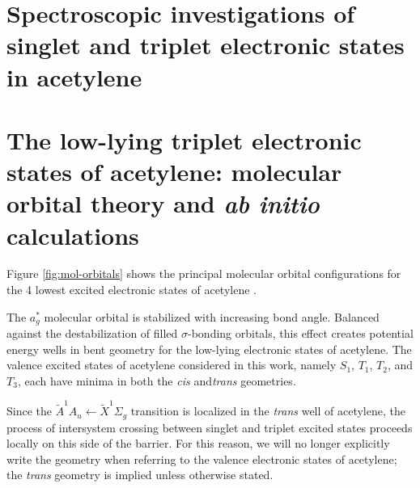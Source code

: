 \documentclass[12pt]{mitthesis}
\begin{document}
\section{Spectroscopic investigations of singlet and
  triplet electronic states in acetylene}




\section{The low-lying triplet electronic states of acetylene:
  molecular orbital theory and \emph{ab initio} calculations}

Figure \ref{fig:mol-orbitals} shows the principal molecular orbital
configurations for the 4 lowest excited electronic states of
acetylene \cite{yamaguchi93}.

  The
$a_g^*$ molecular orbital is stabilized with increasing  bond
angle.  Balanced against the destabilization of filled
$\sigma$-bonding orbitals, this effect creates potential energy wells
in bent geometry for the low-lying electronic states of acetylene.
The valence excited states of acetylene considered in this work,
namely $S_1$, $T_1$, $T_2$, and $T_3$, each have minima in both the
\emph{cis} and\emph{trans} geometries.

  Since the
$\tilde{A}^1A_u \leftarrow \tilde{X}^1\Sigma_g$ transition is
localized in the \emph{trans} well of acetylene, the process of
intersystem crossing between singlet and triplet excited states
proceeds locally on this side of the barrier.  For this reason, we
will no longer explicitly write the geometry when referring to the
valence electronic states of acetylene; the \emph{trans} geometry is
implied unless otherwise stated.
\end{document}
